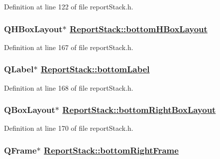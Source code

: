 Definition at line 122 of file report\-Stack.h.\hypertarget{classReportStack_r87}{
\subsubsection[bottomHBoxLayout]{\setlength{\rightskip}{0pt plus 5cm}QHBox\-Layout$\ast$ \hyperlink{classReportStack_r87}{Report\-Stack::bottom\-HBox\-Layout}}}
\label{classReportStack_r87}


Definition at line 167 of file report\-Stack.h.\hypertarget{classReportStack_r88}{
\subsubsection[bottomLabel]{\setlength{\rightskip}{0pt plus 5cm}QLabel$\ast$ \hyperlink{classReportStack_r88}{Report\-Stack::bottom\-Label}}}
\label{classReportStack_r88}


Definition at line 168 of file report\-Stack.h.\hypertarget{classReportStack_r90}{
\subsubsection[bottomRightBoxLayout]{\setlength{\rightskip}{0pt plus 5cm}QBox\-Layout$\ast$ \hyperlink{classReportStack_r90}{Report\-Stack::bottom\-Right\-Box\-Layout}}}
\label{classReportStack_r90}


Definition at line 170 of file report\-Stack.h.\hypertarget{classReportStack_r89}{
\subsubsection[bottomRightFrame]{\setlength{\rightskip}{0pt plus 5cm}QFrame$\ast$ \hyperlink{classReportStack_r89}{Report\-Stack::bottom\-Right\-Frame}}}
\label{classReportStack_r89}


